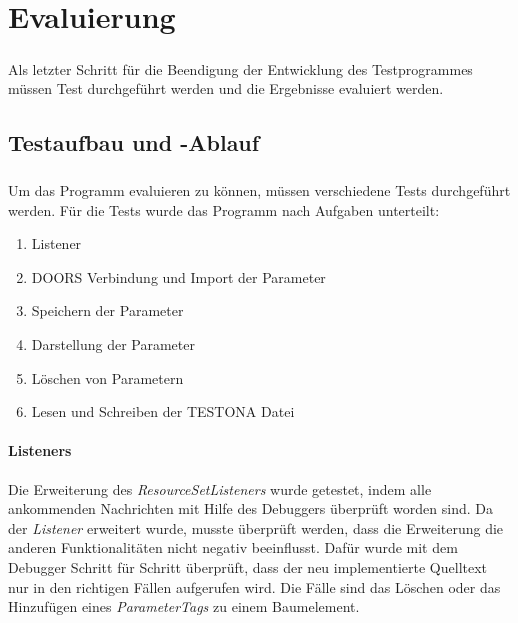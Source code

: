 \chapter{Evaluierung}\label{chp:Evaluierung}
\paragraph{}

Als letzter Schritt für die Beendigung der Entwicklung des Testprogrammes müssen Test durchgeführt werden und die Ergebnisse evaluiert werden.


\newpage
\section{Testaufbau und -Ablauf} \label{sec:test}
\paragraph{}
Um das Programm evaluieren zu können, müssen verschiedene Tests durchgeführt werden. Für die Tests wurde das Programm nach Aufgaben unterteilt:

\begin{enumerate}
\item Listener
\item DOORS Verbindung und Import der Parameter
\item Speichern der Parameter
\item Darstellung der Parameter
\item Löschen von Parametern
\item Lesen und Schreiben der TESTONA Datei
\end{enumerate}


\subsubsection{Listeners}
Die Erweiterung des \textit{ResourceSetListeners} wurde getestet, indem alle ankommenden Nachrichten mit Hilfe des Debuggers überprüft worden sind. Da der \textit{Listener} erweitert wurde, musste überprüft werden, dass die Erweiterung die anderen Funktionalitäten nicht negativ beeinflusst. Dafür wurde mit dem Debugger Schritt für Schritt überprüft, dass der neu implementierte Quelltext nur in den richtigen Fällen aufgerufen wird. Die Fälle sind das Löschen oder das Hinzufügen eines \textit{ParameterTags} zu einem Baumelement.\\



